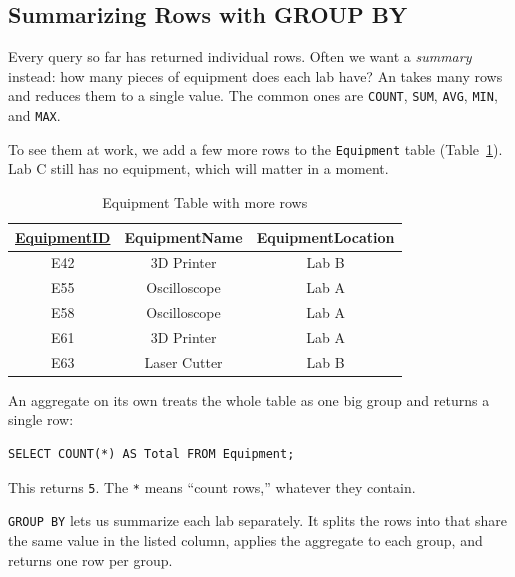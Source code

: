\subsection{Summarizing Rows with GROUP BY}
Every query so far has returned individual rows. Often we want a \emph{summary} instead: how many pieces of equipment does each lab have? An  takes many rows and reduces them to a single value. The common ones are \texttt{COUNT}, \texttt{SUM}, \texttt{AVG}, \texttt{MIN}, and \texttt{MAX}.

To see them at work, we add a few more rows to the \texttt{Equipment} table (Table~\ref{tab:equipment_group}). Lab C still has no equipment, which will matter in a moment.

\begin{table}[H]
\centering
\begin{tabular}{|c|c|c|}
\hline
{\underline{EquipmentID}} & {EquipmentName} & {EquipmentLocation} \\
\hline
E42 & 3D Printer & Lab B \\
\hline
E55 & Oscilloscope & Lab A \\
\hline
E58 & Oscilloscope & Lab A \\
\hline
E61 & 3D Printer & Lab A \\
\hline
E63 & Laser Cutter & Lab B \\
\hline
\end{tabular}
\caption{Equipment Table with more rows}
\label{tab:equipment_group}
\end{table}

An aggregate on its own treats the whole table as one big group and returns a single row:

\begin{translation}
  \sqlrow
\begin{verbatim}
SELECT COUNT(*) AS Total FROM Equipment;
\end{verbatim}
\end{translation}

This returns \texttt{5}. The \texttt{*} means ``count rows,'' whatever they contain.

\texttt{GROUP BY} lets us summarize each lab separately. It splits the rows into  that share the same value in the listed column, applies the aggregate to each group, and returns one row per group.

